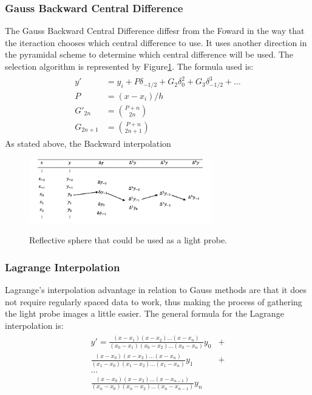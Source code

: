 \documentclass[conference]{acmsiggraph}
\begin{document}
\subsubsection{Gauss Backward Central Difference}
	The Gauss Backward Central Difference diffesr from the Foward in the way that the iteraction chooses which central difference to use. 
It uses another direction in the pyramidal scheme to determine which central difference will be used. The selection algorithm is represented 
by Figure\ref{fig:backwardcentral}. The formula used is:
\begin{align}
\begin{split}
	y' &= y_i + P \delta_{-1/2} + G_2 \delta_0^2 + G_3 \delta_{-1/2}^3 + \dots\\
	P &= (x-x_i)/h \\
	G'_{2n} &= \binom{P+n}{2n} \\
	G_{2n+1} &= \binom{P+n}{2n+1}
\end{split}
\end{align}
	As stated above, the Backward interpolation 

\begin{figure}[H]
	\caption{Reflective sphere that could be used as a light probe.}
	\centering
	\includegraphics[width=08cm]{images/backward.png}
	\label{fig:backwardcentral}
\end{figure}

\subsubsection{Lagrange Interpolation}
	Lagrange’s interpolation advantage in relation to Gauss methods are that it does not require regularly spaced data to work, thus making the process of gathering the light probe images a little easier. The general formula for the Lagrange interpolation is:
\begin{align}
\begin{split}
	y' = \frac{(x-x_1)(x-x_2)\dots(x-x_n)}{(x_0-x_1)(x_0-x_2)\dots(x_0-x_n)}y_0 &+ \\
		 \frac{(x-x_0)(x-x_2)\dots(x-x_n)}{(x_1-x_0)(x_1-x_2)\dots(x_1-x_n)}y_1 &+ \\
		 \dots &\\
		 \frac{(x-x_0)(x-x_2)\dots(x-x_{n-1})}{(x_n-x_0)(x_n-x_2)\dots(x_n-x_{n-1})}y_n &
\end{split}
\end{align}
\end{document}
